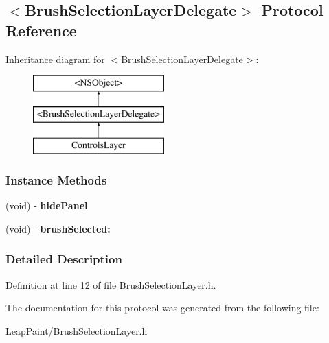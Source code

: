 \hypertarget{protocol_brush_selection_layer_delegate-p}{\subsection{$<$Brush\-Selection\-Layer\-Delegate$>$ Protocol Reference}
\label{d7/dd2/protocol_brush_selection_layer_delegate-p}
}
Inheritance diagram for $<$Brush\-Selection\-Layer\-Delegate$>$\-:\begin{figure}[H]
\begin{center}
\leavevmode
\includegraphics[height=3.000000cm]{d7/dd2/protocol_brush_selection_layer_delegate-p}
\end{center}
\end{figure}
\subsubsection*{Instance Methods}
\begin{DoxyCompactItemize}
\item 
\hypertarget{protocol_brush_selection_layer_delegate-p_a22d681b5b588c7524638b37e1331057e}{(void) -\/ {\bfseries hide\-Panel}}\label{d7/dd2/protocol_brush_selection_layer_delegate-p_a22d681b5b588c7524638b37e1331057e}

\item 
\hypertarget{protocol_brush_selection_layer_delegate-p_ad5ad967fe1efe627f46296129703f8f8}{(void) -\/ {\bfseries brush\-Selected\-:}}\label{d7/dd2/protocol_brush_selection_layer_delegate-p_ad5ad967fe1efe627f46296129703f8f8}

\end{DoxyCompactItemize}


\subsubsection{Detailed Description}


Definition at line 12 of file Brush\-Selection\-Layer.\-h.



The documentation for this protocol was generated from the following file\-:\begin{DoxyCompactItemize}
\item 
Leap\-Paint/Brush\-Selection\-Layer.\-h\end{DoxyCompactItemize}
